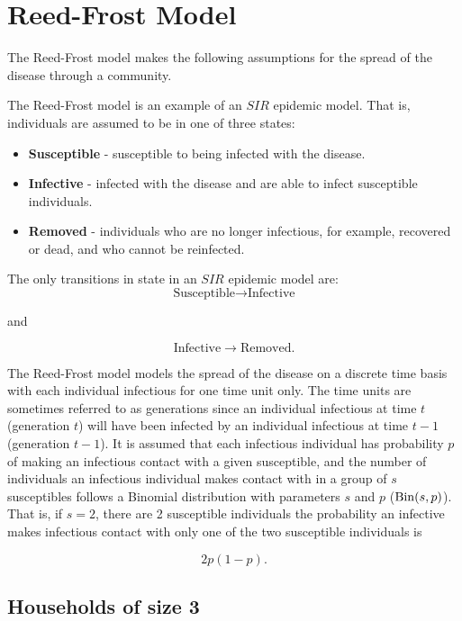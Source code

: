 \documentclass[
]{book}
\providecommand{\tightlist}{%
  \setlength{\itemsep}{0pt}\setlength{\parskip}{0pt}}
\begin{document}
\hypertarget{sec_ReedFrost}{%
\section{Reed-Frost Model}\label{sec_ReedFrost}}

The Reed-Frost model makes the following assumptions for the spread of the disease through a community.

The Reed-Frost model is an example of an \(SIR\) epidemic model. That is,
individuals are assumed to be in one of three states:

\begin{itemize}
\tightlist
\item
  {\textbf{Susceptible}} - susceptible to being infected with the disease.\\
\item
  {\textbf{Infective}} - infected with the disease and are able to infect susceptible individuals.\\
\item
  \textbf{Removed} - individuals who are no longer infectious, for example, recovered or dead, and who cannot be reinfected.
\end{itemize}

The only transitions in state in an \(SIR\) epidemic model are:\\

\[ \mbox{Susceptible} \longrightarrow \mbox{Infective} \]

and

\[ \mbox{Infective} \longrightarrow \mbox{Removed}. \]

The Reed-Frost model models the spread of the disease on a discrete time basis with each individual infectious for one time unit only. The time units are sometimes referred to as generations since an individual infectious at time \(t\) (generation \(t\)) will have been infected by an individual infectious at time \(t-1\) (generation \(t-1\)). It is assumed that each infectious individual has probability \(p\) of making an infectious contact with a given susceptible, and the number of individuals an infectious individual makes contact with in a group of \(s\) susceptibles follows a Binomial distribution with parameters \(s\) and \(p\) (\({\rm Bin} (s,p)\)). That is, if \(s=2\), there are 2 susceptible individuals the probability an infective makes infectious contact with only one of the two susceptible individuals is

\[2 p (1-p). \]

\hypertarget{households-of-size-3}{%
\subsection*{Households of size 3}\label{households-of-size-3}}
\end{document}
